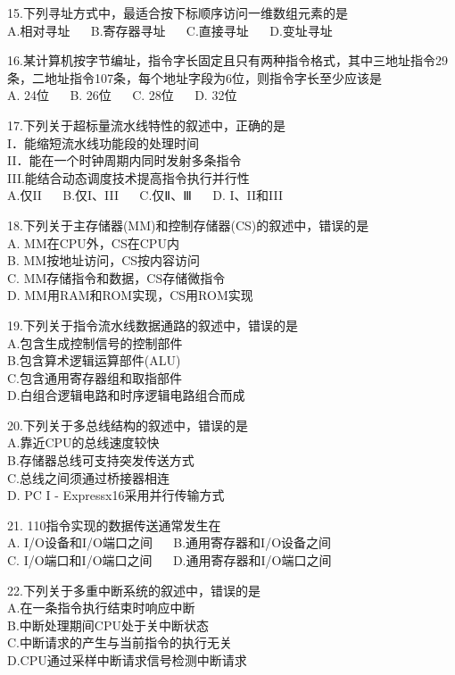 15.下列寻址方式中，最适合按下标顺序访问一维数组元素的是 \\
A.相对寻址 $\quad$ B.寄存器寻址 $\quad$ C.直接寻址 $\quad$ D.变址寻址

16.某计算机按字节编址，指令字长固定且只有两种指令格式，其中三地址指令29条，二地址指令107条，每个地址字段为6位，则指令字长至少应该是 \\
A. 24位  $\quad$  B. 26位  $\quad$  C. 28位  $\quad$  D. 32位

17.下列关于超标量流水线特性的叙述中，正确的是 \\
I．能缩短流水线功能段的处理时间 \\
II．能在一个时钟周期内同时发射多条指令 \\
III.能结合动态调度技术提高指令执行并行性 \\
A.仅II  $\quad$  B.仅I、III  $\quad$  C.仅Ⅱ、Ⅲ  $\quad$  D.  I、II和III

18.下列关于主存储器(MM)和控制存储器(CS)的叙述中，错误的是 \\
A. MM在CPU外，CS在CPU内 \\
B. MM按地址访问，CS按内容访问 \\
C. MM存储指令和数据，CS存储微指令 \\
D. MM用RAM和ROM实现，CS用ROM实现

19.下列关于指令流水线数据通路的叙述中，错误的是 \\
A.包含生成控制信号的控制部件 \\
B.包含算术逻辑运算部件(ALU) \\
C.包含通用寄存器组和取指部件 \\
D.白组合逻辑电路和时序逻辑电路组合而成

20.下列关于多总线结构的叙述中，错误的是 \\
A.靠近CPU的总线速度较快 \\
B.存储器总线可支持突发传送方式 \\
C.总线之间须通过桥接器相连 \\
D.  PC I - Expressx16采用并行传输方式

21. 110指令实现的数据传送通常发生在 \\
A. I/O设备和I/O端口之间  $\quad$  B.通用寄存器和I/O设备之间 \\
C. I/O端口和I/O端口之间  $\quad$  D.通用寄存器和I/O端口之间

22.下列关于多重中断系统的叙述中，错误的是 \\
A.在一条指令执行结束时响应中断 \\
B.中断处理期间CPU处于关中断状态 \\
C.中断请求的产生与当前指令的执行无关 \\
D.CPU通过采样中断请求信号检测中断请求 \\

